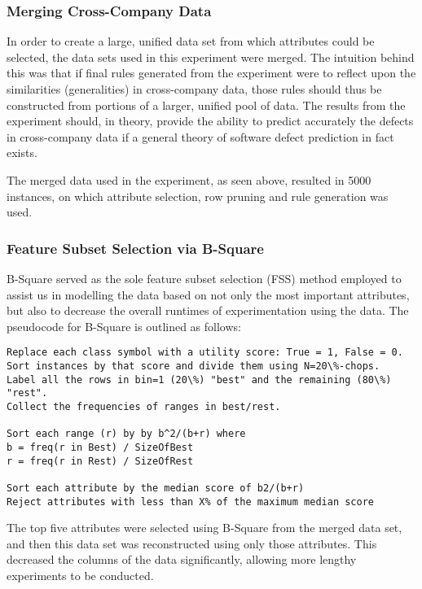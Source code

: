 \documentclass{sig-alternate}
\begin{document}
\subsubsection{Merging Cross-Company Data}

In order to create a large, unified data set from which attributes could be selected, the data sets used in this experiment were merged. The intuition behind this was that if final rules generated from the experiment were to reflect upon the similarities (generalities) in cross-company data, those rules should thus be constructed from portions of a larger, unified pool of data. The results from the experiment should, in theory, provide the ability to predict accurately the defects in cross-company data if a general theory of software defect prediction in fact exists.

The merged data used in the experiment, as seen above, resulted in 5000 instances, on which attribute selection, row pruning and rule generation was used.

\subsubsection{Feature Subset Selection via B-Square}

B-Square served as the sole feature subset selection (FSS) method employed to assist us in modelling the data based on not only the most important attributes, but also to decrease the overall runtimes of experimentation using the data. The pseudocode for B-Square is outlined as follows:

\begin{centering}
\begin{verbatim}
Replace each class symbol with a utility score: True = 1, False = 0.
Sort instances by that score and divide them using N=20\%-chops.
Label all the rows in bin=1 (20\%) "best" and the remaining (80\%) "rest".
Collect the frequencies of ranges in best/rest.

Sort each range (r) by by b^2/(b+r) where
b = freq(r in Best) / SizeOfBest
r = freq(r in Rest) / SizeOfRest

Sort each attribute by the median score of b2/(b+r)
Reject attributes with less than X% of the maximum median score
\end{verbatim}
\end{centering}

The top five attributes were selected using B-Square from the merged data set, and then this data set was reconstructed using only those attributes. This decreased the columns of the data significantly, allowing more lengthy experiments to be conducted.
\end{document}
